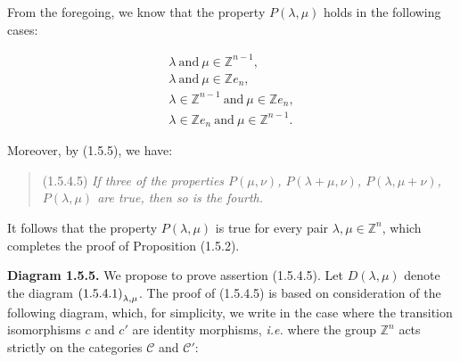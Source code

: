 %
From the foregoing, we know that the property $P(\lambda,\mu)$ holds
in the following cases:

\begin{equation}
  \begin{gathered}
    \lambda\ \text{and}\ \mu\in\mathbb Z^{n-1},\\
    \lambda\ \text{and}\ \mu\in\mathbb Z e_n,\\
    \lambda\in\mathbb Z^{n-1}\ \text{and}\ \mu\in\mathbb Z e_n,\\
    \lambda\in\mathbb Z e_n\ \text{and}\ \mu\in\mathbb Z^{n-1}.
  \end{gathered}
  \tag{1.5.4.4}
\end{equation}

Moreover, by (1.5.5), we have:

\begin{quote}
  \noindent\textup{(1.5.4.5)}\quad
  \emph{If three of the properties $P(\mu,\nu)$,
  $P(\lambda+\mu,\nu)$, $P(\lambda,\mu+\nu)$, $P(\lambda,\mu)$
  are true, then so is the fourth.}
\end{quote}

It follows that the property $P(\lambda,\mu)$ is true for every pair
$\lambda,\mu\in\mathbb Z^n$, which completes the proof of
Proposition (1.5.2).

\noindent\textbf{Diagram 1.5.5.}\quad
We propose to prove assertion (1.5.4.5). Let $D(\lambda,\mu)$ denote
the diagram $\textup{(1.5.4.1)}_{\lambda,\mu}$. The proof of
(1.5.4.5) is based on consideration of the following diagram, which,
for simplicity, we write in the case where the transition isomorphisms
$c$ and $c'$ are identity morphisms, \emph{i.e.} where the group
$\mathbb Z^n$ acts strictly on the categories $\mathcal C$ and
$\mathcal C'$:

\begin{center}
\end{center}

